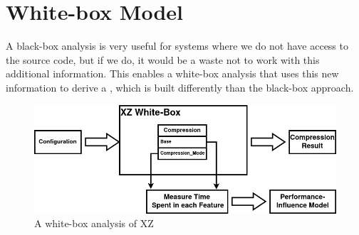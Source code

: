 



\section{White-box Model}\label{ch:Whitebox}

A black-box analysis is very useful for systems where we do not have access to the source code, but if we do, it
would be a waste not to work with this additional information. 
This enables a white-box analysis 
that uses this new information to derive a \perfInfluenceModel, which is built differently than the black-box approach.


\begin{figure}[h]
    \centering
    \includegraphics[scale=0.6]{gfx/whitebox_2.png}
    \caption{A white-box analysis of XZ}
    \label{fig:WBxz}
\end{figure}

